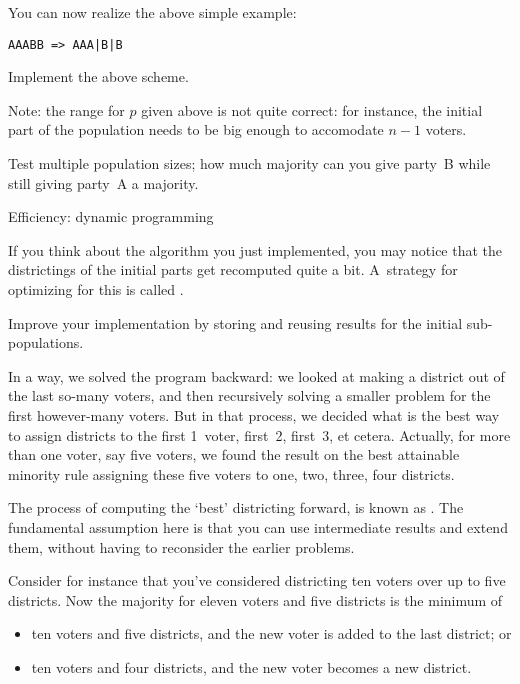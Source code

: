 You can now realize the above simple example:
\begin{verbatim}
AAABB => AAA|B|B
\end{verbatim}

\begin{exercise}
  Implement the above scheme.

  Note: the range for $p$ given above is not quite correct: for instance,
  the initial part of the population needs to be big enough to
  accomodate $n-1$ voters.
\end{exercise}

\begin{exercise}
  Test multiple population sizes; how much majority can you give
  party~B while still giving party~A a majority.
\end{exercise}

 {Efficiency: dynamic programming}

If you think about the algorithm you just implemented, you may notice
that the districtings of the initial parts get recomputed quite a bit.
A~strategy for optimizing for this is called .

\begin{exercise}
  Improve your implementation by storing and reusing results for the
  initial sub-populations.
\end{exercise}

In a way, we solved the program backward: we looked at making a
district out of the last so-many voters, and then recursively solving
a smaller problem for the first however-many voters. But in that
process, we decided what is the best way to assign districts to the
first 1~voter, first~2, first~3, et cetera. Actually, for more than
one voter, say five voters, we found the result on the best attainable
minority rule assigning these five voters to one, two, three, four
districts.

The process of computing the `best' districting forward, is known as
. The fundamental assumption here
is that you can use intermediate results and extend them, without
having to reconsider the earlier problems.

Consider for instance that you've considered districting ten voters over up to
five districts. Now the majority for eleven voters and five districts
is the minimum of
\begin{itemize}
\item ten voters and five districts, and the new voter is added to the
  last district; or
\item ten voters and four districts, and the new voter becomes a new district.
\end{itemize}

